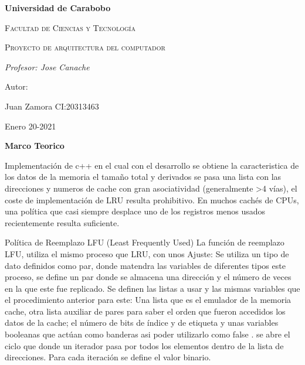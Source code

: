 \documentclass{report}
\begin{document}
\begin{titlepage}
\centering
{\bfseries\LARGE Universidad de Carabobo \par}
\vspace{1cm}
{\scshape\Large Facultad de Ciencias y Tecnolog\'ia \par}
\vspace{3cm}
{\scshape\Huge Proyecto de arquitectura del computador\par}
\vspace{3cm}
{\itshape\Large Profesor: Jose Canache \par}
\vfill
{\Large Autor: \par}
{\Large Juan Zamora CI:20313463\par}
\vfill
{\Large Enero 20-2021 \par}
 
\end{titlepage}
\begin{titlepage}
\centering
{\bfseries\LARGE    Marco Teorico \par}
Implementaci\'on de c++ en el cual con el desarrollo se obtiene la caracteristica de los datos de la memoria el tamaño total y derivados se pasa una lista con las direcciones y numeros de cache con gran asociatividad (generalmente >4 vías), el coste de implementación de LRU resulta prohibitivo. En muchos cachés de CPUs, una política que casi siempre desplace uno de los registros menos usados recientemente resulta suficiente.

Política de Reemplazo LFU (Least Frequently Used)
La función de reemplazo LFU, utiliza el mismo proceso que  LRU, con unos Ajuste: Se utiliza un tipo de dato definidos como par, donde matendra las variables de diferentes tipos este proceso, se define un par donde se almacena una dirección y el número de veces en la que este fue replicado.
Se definen las listas a usar y las mismas variables que el procedimiento anterior para este: Una lista que es el emulador de la memoria cache, otra lista auxiliar de pares para saber el orden que fueron accedidos los datos de la cache; el número de bits de índice y de etiqueta y unas variables booleanas que actúan como banderas asi poder utilizarlo como false  . 
se abre el ciclo que donde un iterador pasa por todos los elementos dentro de la lista de direcciones. Para cada iteración se define el valor binario.
\end{titlepage}
\end{document}
